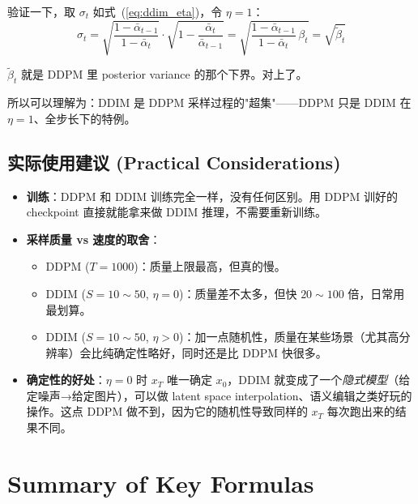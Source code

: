 \documentclass[11pt,a4paper]{article}
\theoremstyle{definition}
\newcommand{\alphat}{\bar{\alpha}_t}
\newcommand{\btd}{\tilde{\beta}_t}
\begin{document}
验证一下，取 $\sigma_t$ 如式~(\ref{eq:ddim_eta})，令 $\eta = 1$：
\begin{equation}\label{eq:ddpm_via_ddim}
    \sigma_t = \sqrt{\frac{1 - \bar{\alpha}_{t-1}}{1 - \alphat}} \cdot \sqrt{1 - \frac{\alphat}{\bar{\alpha}_{t-1}}}
            = \sqrt{\frac{1 - \bar{\alpha}_{t-1}}{1 - \alphat}\, \beta_t}
            = \sqrt{\btd}
\end{equation}

$\btd$ 就是 DDPM 里 posterior variance 的那个下界。对上了。

所以可以理解为：DDIM 是 DDPM 采样过程的"超集"——DDPM 只是 DDIM 在 $\eta=1$、全步长下的特例。



\subsection{实际使用建议 (Practical Considerations)}

\begin{itemize}
    \item \textbf{训练}：DDPM 和 DDIM 训练完全一样，没有任何区别。用 DDPM 训好的 checkpoint 直接就能拿来做 DDIM 推理，不需要重新训练。
    \item \textbf{采样质量 vs 速度的取舍}：
    \begin{itemize}
        \item DDPM ($T=1000$)：质量上限最高，但真的慢。
        \item DDIM ($S=10\sim 50$, $\eta=0$)：质量差不太多，但快 $20\sim 100$ 倍，日常用最划算。
        \item DDIM ($S=10\sim 50$, $\eta>0$)：加一点随机性，质量在某些场景（尤其高分辨率）会比纯确定性略好，同时还是比 DDPM 快很多。
    \end{itemize}
    \item \textbf{确定性的好处}：$\eta=0$ 时 $x_T$ 唯一确定 $x_0$，DDIM 就变成了一个\emph{隐式模型}（给定噪声→给定图片），可以做 latent space interpolation、语义编辑之类好玩的操作。这点 DDPM 做不到，因为它的随机性导致同样的 $x_T$ 每次跑出来的结果不同。
\end{itemize}


\section{Summary of Key Formulas}
\end{document}
